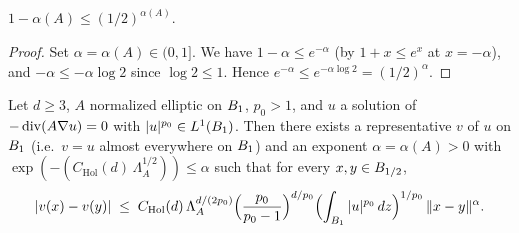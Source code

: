 \begin{lemma}
\label{lem:one_sub_moserDecayAlpha_le_two_rpow_neg}
\leanok
{}
$1 - \alpha(A) \leq (1/2)^{\alpha(A)}$.
\end{lemma}

\begin{proof}
\leanok
{}

Set $\alpha = \alpha(A) \in (0,1]$. We have $1 - \alpha \leq e^{-\alpha}$
(by $1+x \leq e^x$ at $x = -\alpha$), and $-\alpha \leq -\alpha\log 2$ since
$\log 2 \leq 1$. Hence $e^{-\alpha} \leq e^{-\alpha\log 2} = (1/2)^\alpha$.
\end{proof}

\begin{theorem}
\label{thm:holder-Moser}
\leanok
{}
Let $d \geq 3$, $A$ normalized elliptic on $B_{1}$, $p_0 > 1$, and $u$ a
solution of $-\operatorname{div}(A\nabla u) = 0$ with $|u|^{p_0} \in L^{1}(B_{1})$.
Then there exists a representative $v$ of $u$ on $B_{1}$ (i.e.\ $v = u$
almost everywhere on $B_{1}$) and an exponent
$\alpha = \alpha(A) > 0$ with
$\exp(-(C_{\mathrm{Hol}}(d)\,\Lambda_A^{1/2})) \leq \alpha$ such that for
every $x, y \in B_{1/2}$,
\begin{equation*}
  |v(x) - v(y)|
   \;\leq\; C_{\mathrm{Hol}}(d)\,\Lambda_A^{d/(2p_0)}
        \Bigl(\frac{p_0}{p_0 - 1}\Bigr)^{d/p_0}
        \Bigl(\int_{B_{1}} |u|^{p_0}\,dz\Bigr)^{1/p_0}
        \,\|x - y\|^{\alpha}.
\end{equation*}
\end{theorem}

